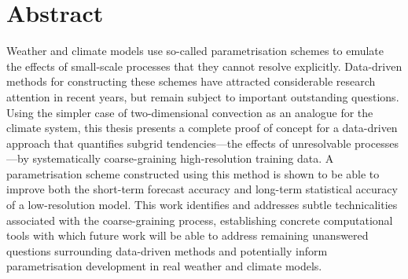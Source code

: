 \documentclass[../main.tex]{subfiles}
\begin{document}
\chapter*{Abstract}
Weather and climate models use so-called parametrisation schemes to emulate the
effects of small-scale processes that they cannot resolve explicitly.
Data-driven methods for constructing these schemes have attracted considerable
research attention in recent years, but remain subject to important outstanding
questions. Using the simpler case of two-dimensional \rb{} convection as an
analogue for the climate system, this thesis presents a complete proof of
concept for a data-driven approach that quantifies subgrid tendencies---the
effects of unresolvable processes---by systematically coarse-graining
high-resolution training data. A parametrisation scheme constructed using this
method is shown to be able to improve both the short-term forecast accuracy and
long-term statistical accuracy of a low-resolution model. This work identifies
and addresses subtle technicalities associated with the coarse-graining
process, establishing concrete computational tools with which future work will
be able to address remaining unanswered questions surrounding data-driven
methods and potentially inform parametrisation development in real
weather and climate models.


\tableofcontents

\makeatletter\@openrighttrue\makeatother
\mainmatter
\end{document}
